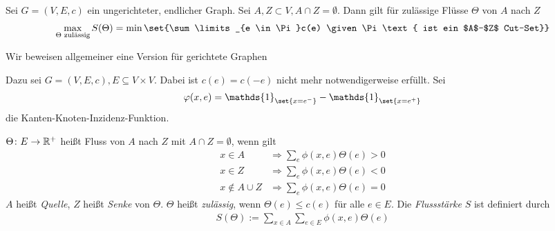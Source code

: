 \begin{satz}
	Sei $G = (V,E,c)$ ein ungerichteter, endlicher Graph. Sei $A,Z \subset V, A \cap Z = \emptyset$. Dann gilt für zulässige Flüsse $\Theta$ von $A$ nach $Z$
	\begin{align}
		\max\limits_{\Theta \text{ zulässig}} S(\Theta) = \min \set{\sum\limits_{e \in \Pi}c(e) \given \Pi \text{ ist ein $A$--$Z$ Cut--Set}}
	\end{align}
\end{satz}
Wir beweisen allgemeiner eine Version für gerichtete Graphen
\begin{beweis}
	Dazu sei $G = (V,E,c), E \subseteq V \times V$. Dabei ist $c(e) = c(-e)$ nicht mehr notwendigerweise erfüllt. Sei
	\begin{align}
		\phi (x,e) = \mathds{1}_{\set{x = e^-}}- \mathds{1}_{\set{x = e^+}}
	\end{align}
	die Kanten-Knoten-Inzidenz-Funktion.

\end{beweis}

\begin{definition}
	$\Theta\colon E \to \mathbb{R}^+$ heißt Fluss von $A$ nach $Z$ mit $A \cap Z = \emptyset$, wenn gilt
	\begin{align}
		x \in A &\Rightarrow \sum\limits_{e} \phi(x,e) \Theta(e) > 0 \\
		x \in Z &\Rightarrow \sum\limits_{e} \phi(x,e) \Theta(e) < 0 \\
		x \notin A \cup Z &\Rightarrow \sum\limits_{e} \phi(x,e) \Theta(e) = 0
	\end{align}
	$A$ heißt \emph{Quelle}, $Z$ heißt \emph{Senke} von $\Theta$. $\Theta$ heißt \emph{zulässig}, wenn $\Theta(e) \leq c(e)$ für alle $e \in E$. Die \emph{Flussstärke} $S$ ist definiert durch
	\begin{align}
		S(\Theta):= \sum\limits_{x \in A} \sum\limits_{e \in E} \phi(x,e) \Theta(e)
	\end{align}
\end{definition}
	
